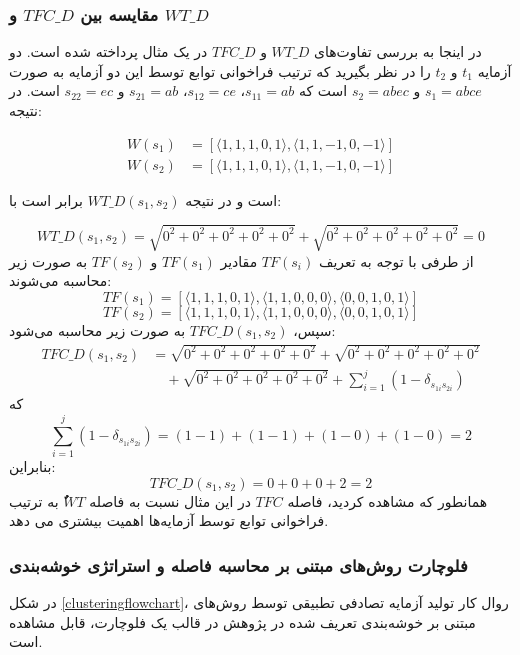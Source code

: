 \subsubsection{مقایسه بین \(TFC\_D\) و \(WT\_D\)}
در اینجا به بررسی تفاوت‌های \(WT\_D\) و \(TFC\_D\) در یک مثال پرداخته شده است. دو آزمایه \(t_1\) و \(t_2\) را در نظر بگیرید که ترتیب فراخوانی توابع توسط این دو آزمایه به صورت \(s_1 = abce\) و \(s_2 = abec\) است که \(s_{11} = ab\)، \(s_{12} = ce\)، \(s_{21} = ab\) و \(s_{22} = ec\) است. در نتیجه:

\begin{align*}
	W(s_1) &= \left[\langle 1, 1, 1, 0, 1 \rangle, \langle 1, 1, -1, 0, -1 \rangle \right] \\
	W(s_2) &= \left[\langle 1, 1, 1, 0, 1 \rangle, \langle 1, 1, -1, 0, -1 \rangle \right]
\end{align*}

است و در نتیجه \({WT\_D}(s_1, s_2)\) برابر است با:

\[
WT\_D(s_1, s_2) = \sqrt{0^2 + 0^2 + 0^2 + 0^2 + 0^2} + \sqrt{0^2 + 0^2 + 0^2 + 0^2 + 0^2} = 0
\]
از طرفی با توجه به تعریف \(TF(s_i)\) مقادیر \(TF(s_1)\) و \(TF(s_2)\) به صورت زیر محاسبه می‌شوند:
\[
TF(s_1) = \left[\langle 1, 1, 1, 0, 1 \rangle, \langle 1, 1, 0, 0, 0 \rangle, \langle 0, 0, 1, 0, 1 \rangle\right]
\]
\[
TF(s_2) = \left[\langle 1, 1, 1, 0, 1 \rangle, \langle 1, 1, 0, 0, 0 \rangle, \langle 0, 0, 1, 0, 1 \rangle\right]
\]
سپس، \(TFC\_D(s_1, s_2)\) به صورت زیر محاسبه می‌شود:
\begin{align*}
	TFC\_D(s_1, s_2) &= \sqrt{0^2 + 0^2 + 0^2 + 0^2 + 0^2} + \sqrt{0^2 + 0^2 + 0^2 + 0^2 + 0^2} \\
	&\quad + \sqrt{0^2 + 0^2 + 0^2 + 0^2 + 0^2} + \sum_{i=1}^{j} \left(1 - \delta_{s_{1i}s_{2i}}\right)
\end{align*}
که
\[
\sum_{i=1}^{j} \left(1 - \delta_{s_{1i}s_{2i}}\right) = (1-1) + (1-1)  + (1-0)  + (1-0) = 2
\]
بنابراین:
\[
TFC\_D(s_1, s_2) = 0 + 0 + 0 + 2 = 2 
\]
همانطور که مشاهده کردید،‌ فاصله \(TFC\) در این مثال نسبت به فاصله \(ٌُWT\)  به ترتیب فراخوانی توابع توسط آزمایه‌ها اهمیت بیشتری می دهد.

\subsubsection{فلوچارت روش‌های مبتنی بر محاسبه فاصله و استراتژی خوشه‌بندی}

در شکل \ref{clusteringflowchart}، روال کار تولید آزمایه تصادفی تطبیقی توسط روش‌های مبتنی بر خوشه‌بندی تعریف شده در پژوهش \cite{chen2021novel} در قالب یک فلوچارت، قابل مشاهده است.

